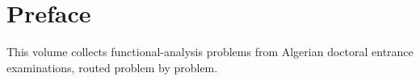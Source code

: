 \documentclass[print]{docmathdz}
\begin{document}
\chapter*{Preface}
This volume collects functional-analysis problems from Algerian doctoral entrance examinations, routed problem by problem.
\mainmatter


\backmatter\printbibliography[heading=bibintoc,title={References}]\printindex
\end{document}

